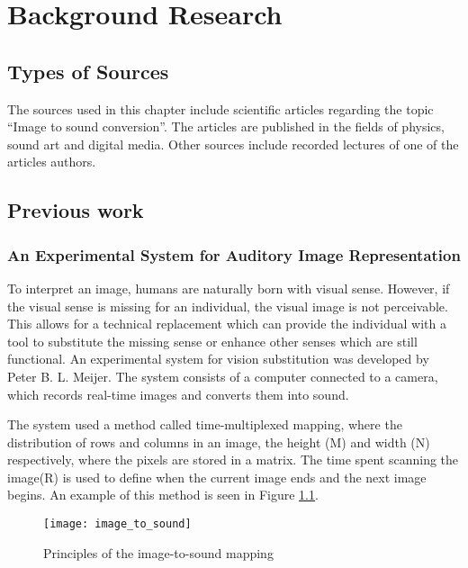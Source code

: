 \chapter{Background Research}\label{ch:bgresearch}



\section{Types of Sources}\label{sec:typesofsources} 
The sources used in this chapter include scientific articles regarding the topic “Image to sound conversion”. The articles are published in the fields of physics, sound art and digital media. Other sources include recorded lectures of one of the articles authors.

\section{Previous work}\label{sec:previouswork}

\subsection{An Experimental System for Auditory Image Representation}\label{sec:experimentalsystem}

To interpret an image, humans are naturally born with visual sense. However, if the visual sense is missing for an individual, the visual image is not perceivable. This allows for a technical replacement which can provide the individual with a tool to substitute the missing sense or enhance other senses which are still functional. An experimental system for vision substitution was developed by Peter B. L. Meijer\cite{Meijer1992}. The system consists of a computer connected to a camera, which records real-time images and converts them into sound. 

The system used a method called time-multiplexed mapping, where the distribution of rows and columns in an image, the height (M) and width (N) respectively, where the pixels are stored in a matrix. The time spent scanning the image(R) is used to define when the current image ends and the next image begins. An example of this method is seen in Figure \ref{fig:image_to_sound}. 

\begin{figure}[!h] 
\centering
\texttt{[image: image\_to\_sound]}
\caption{\label{fig:image_to_sound} Principles of the image-to-sound mapping \cite{Meijer1992}}
\end{figure}
\cite{Meijer1992}

